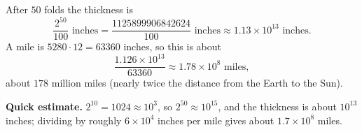 After $50$ folds the thickness is
\[\dfrac{2^{50}}{100}\text{ inches}=\dfrac{1125899906842624}{100}\text{ inches}\approx\boxed{1.13\times10^{13}\text{ inches}}.\]
A mile is $5280\cdot12=63360$ inches, so this is about
\[\dfrac{1.126\times10^{13}}{63360}\approx\boxed{1.78\times10^{8}\text{ miles}},\]
about $178$ million miles (nearly twice the distance from the Earth to the Sun).

\textbf{Quick estimate.} $2^{10}=1024\approx10^3$, so $2^{50}\approx10^{15}$, and the thickness is about $10^{13}$ inches; dividing by roughly $6\times10^4$ inches per mile gives about $1.7\times10^8$ miles.
